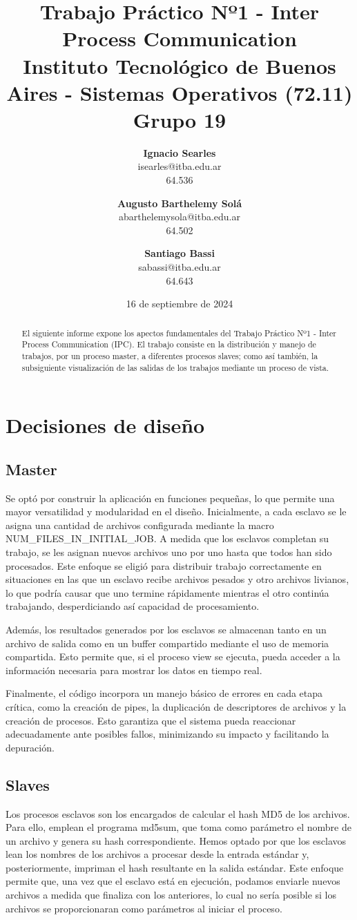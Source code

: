 \documentclass{article}
\title{\textbf{Trabajo Práctico Nº1 - Inter Process Communication} \\ [1ex]
\large Instituto Tecnológico de Buenos Aires - Sistemas Operativos (72.11) \\ [1ex]
\large Grupo  19}
\date{16 de septiembre de 2024}
\author{
\textbf{Ignacio Searles}\\
isearles@itba.edu.ar\\
64.536
\and
\textbf{Augusto Barthelemy Solá}\\
abarthelemysola@itba.edu.ar\\
64.502
\and
\textbf{Santiago Bassi}\\
sabassi@itba.edu.ar\\
64.643
}
\begin{document}
\maketitle

\begin{abstract}
El siguiente informe expone los apectos fundamentales del Trabajo Práctico Nº1 - Inter Process Communication (IPC). El trabajo consiste en la distribución y manejo de trabajos, por un proceso master, a diferentes procesos slaves; como así también, la subsiguiente visualización de las salidas de los trabajos mediante un proceso de vista.
\end{abstract}

\section{Decisiones de diseño}

\subsection{Master}
Se optó por construir la aplicación en funciones pequeñas, lo que permite una mayor versatilidad y modularidad en el diseño. Inicialmente, a cada esclavo se le asigna una cantidad de archivos configurada mediante la macro NUM\_FILES\_IN\_INITIAL\_JOB. A medida que los esclavos completan su trabajo, se les asignan nuevos archivos uno por uno hasta que todos han sido procesados. Este enfoque se eligió para distribuir trabajo correctamente en situaciones en las que un esclavo recibe archivos pesados y otro archivos livianos, lo que podría causar que uno termine rápidamente mientras el otro continúa trabajando, desperdiciando así capacidad de procesamiento.

Además, los resultados generados por los esclavos se almacenan tanto en un archivo de salida como en un buffer compartido mediante el uso de memoria compartida. Esto permite que, si el proceso view se ejecuta, pueda acceder a la información necesaria para mostrar los datos en tiempo real.

Finalmente, el código incorpora un manejo básico de errores en cada etapa crítica, como la creación de pipes, la duplicación de descriptores de archivos y la creación de procesos. Esto garantiza que el sistema pueda reaccionar adecuadamente ante posibles fallos, minimizando su impacto y facilitando la depuración.

\subsection{Slaves}
Los procesos esclavos son los encargados de calcular el hash MD5 de los archivos. Para ello, emplean el programa md5sum, que toma como parámetro el nombre de un archivo y genera su hash correspondiente. Hemos optado por que los esclavos lean los nombres de los archivos a procesar desde la entrada estándar y, posteriormente, impriman el hash resultante en la salida estándar. Este enfoque permite que, una vez que el esclavo está en ejecución, podamos enviarle nuevos archivos a medida que finaliza con los anteriores, lo cual no sería posible si los archivos se proporcionaran como parámetros al iniciar el proceso.
\end{document}
